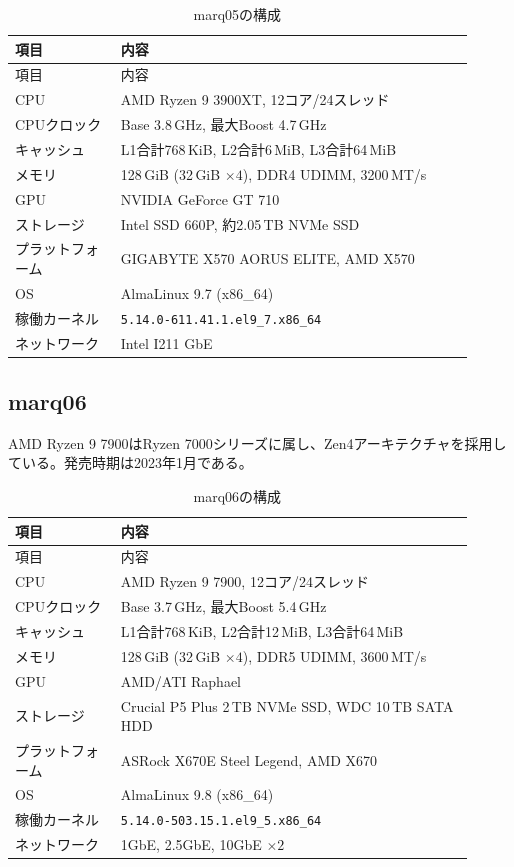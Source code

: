 \documentclass[../main.tex]{subfiles}
\begin{document}
\begingroup
\small
\renewcommand{\arraystretch}{1.2}
\begin{longtable}{|p{0.21\linewidth}|p{0.70\linewidth}|}
\caption{marq05の構成}\label{tab:environment-marq05}\\
\hline
項目 & 内容 \\
\hline
\endfirsthead
\hline
項目 & 内容 \\
\hline
\endhead
CPU & AMD Ryzen 9 3900XT, 12コア/24スレッド \\
\hline
CPUクロック & Base 3.8\,GHz, 最大Boost 4.7\,GHz \\
\hline
キャッシュ & L1合計768\,KiB, L2合計6\,MiB, L3合計64\,MiB \\
\hline
メモリ & 128\,GiB (32\,GiB $\times 4$), DDR4 UDIMM, 3200\,MT/s \\
\hline
GPU & NVIDIA GeForce GT 710 \\
\hline
ストレージ & Intel SSD 660P, 約2.05\,TB NVMe SSD \\
\hline
プラットフォーム & GIGABYTE X570 AORUS ELITE, AMD X570 \\
\hline
OS & AlmaLinux 9.7 (x86\_64) \\
\hline
稼働カーネル & \texttt{5.14.0-611.41.1.el9\_7.x86\_64} \\
\hline
ネットワーク & Intel I211 GbE \\
\hline
\end{longtable}
\endgroup


\subsection{marq06}
\label{sec:environment-marq06}
AMD Ryzen 9 7900はRyzen 7000シリーズに属し、Zen4アーキテクチャを採用している。発売時期は2023年1月である。

\begingroup
\small
\renewcommand{\arraystretch}{1.2}
\begin{longtable}{|p{0.21\linewidth}|p{0.70\linewidth}|}
\caption{marq06の構成}\label{tab:environment-marq06}\\
\hline
項目 & 内容 \\
\hline
\endfirsthead
\hline
項目 & 内容 \\
\hline
\endhead
CPU & AMD Ryzen 9 7900, 12コア/24スレッド \\
\hline
CPUクロック & Base 3.7\,GHz, 最大Boost 5.4\,GHz \\
\hline
キャッシュ & L1合計768\,KiB, L2合計12\,MiB, L3合計64\,MiB \\
\hline
メモリ & 128\,GiB (32\,GiB $\times 4$), DDR5 UDIMM, 3600\,MT/s \\
\hline
GPU & AMD/ATI Raphael \\
\hline
ストレージ & Crucial P5 Plus 2\,TB NVMe SSD, WDC 10\,TB SATA HDD \\
\hline
プラットフォーム & ASRock X670E Steel Legend, AMD X670 \\
\hline
OS & AlmaLinux 9.8 (x86\_64) \\
\hline
稼働カーネル & \texttt{5.14.0-503.15.1.el9\_5.x86\_64} \\
\hline
ネットワーク & 1GbE, 2.5GbE, 10GbE $\times 2$ \\
\hline
\end{longtable}
\endgroup
\end{document}
